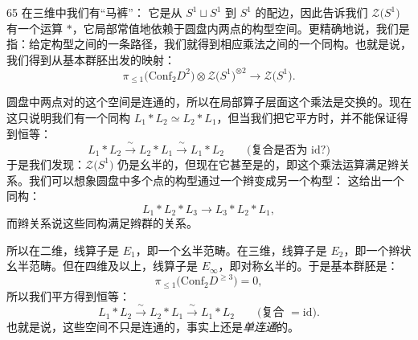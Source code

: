\begin{srcex}{65}
在三维中我们有“马裤”：
它是从 $S^1\sqcup S^1$ 到 $S^1$ 的配边，因此告诉我们 $\mathcal{Z}\big(S^1\big)$ 有一个运算 $*$，它局部常值地依赖于圆盘内两点的构型空间。更精确地说，我们是指：给定构型之间的一条路径，我们就得到相应乘法之间的一个同构。也就是说，我们得到从基本群胚出发的映射：
\begin{equation}\tag{10.165}
\pi_{\le1}\big(\mathrm{Conf}_2 D^2\big)\otimes\mathcal{Z}\big(S^1\big)^{\otimes2}\longrightarrow\mathcal{Z}\big(S^1\big).
\end{equation}
\end{srcex}
圆盘中两点对的这个空间是连通的，所以在局部算子层面这个乘法是交换的。现在这只说明我们有一个同构 $L_1*L_2\simeq L_2*L_1$，但当我们把它平方时，并不能保证得到恒等：
\begin{equation}\tag{10.166}
L_1*L_2\xrightarrow{\ \sim\ }L_2*L_1\xrightarrow{\ \sim\ }L_1*L_2
\qquad\big(\text{复合是否为 }\mathrm{id}?\big)
\end{equation}
于是我们发现：$\mathcal{Z}\big(S^1\big)$ 仍是幺半的，但现在它甚至是的，即这个乘法运算满足辫关系。我们可以想象圆盘中多个点的构型通过一个辫变成另一个构型：
这给出一个同构：
\begin{equation}\tag{10.168}
L_1*L_2*L_3\longrightarrow L_3*L_2*L_1,
\end{equation}
而辫关系说这些同构满足辫群的关系。

所以在二维，线算子是 $E_1$，即一个幺半范畴。在三维，线算子是 $E_2$，即一个辫状幺半范畴。但在四维及以上，线算子是 $E_\infty$，即对称幺半的。于是基本群胚是：
\begin{equation}\tag{10.169}
\pi_{\le1}\big(\mathrm{Conf}_2 D^{\ge3}\big)=0,
\end{equation}
所以我们平方得到恒等：
\begin{equation}\tag{10.170}
L_1*L_2\xrightarrow{\ \sim\ }L_2*L_1\xrightarrow{\ \sim\ }L_1*L_2
\qquad\big(\text{复合 }=\mathrm{id}\big).
\end{equation}
也就是说，这些空间不只是连通的，事实上还是\emph{单连通}的。


